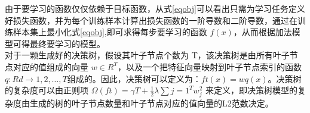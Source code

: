 \documentclass[a4paper]{article}
\begin{document}
由于要学习的函数仅仅依赖于目标函数，从式\ref{eqobj}可以看出只需为学习任务定义好损失函数，并为每个训练样本计算出损失函数的一阶导数和二阶导数，通过在训练样本集上最小化式\ref{eqobj},即可求得每步要学习的函数 $f(x)$，从而根据加法模型可得最终要学习的模型。\\

对于一颗生成好的决策树，假设其叶子节点个数为 T，该决策树是由所有叶子节点对应的值组成的向量 $w\in R^T$，以及一个把特征向量映射到叶子节点索引的函数 $q:Rd→1,2,\ldots,T$组成的。因此，决策树可以定义为：$ft(x)=w{q(x)}$。决策树的复杂度可以由正则项 $\Omega(ft)=\gamma T + \frac12 \lambda \sum{j=1}^T w_j^2$ 来定义，即决策树模型的复杂度由生成的树的叶子节点数量和叶子节点对应的值向量的L2范数决定。






\newpage
\printbibliography[title=参考文献]
\end{document}
